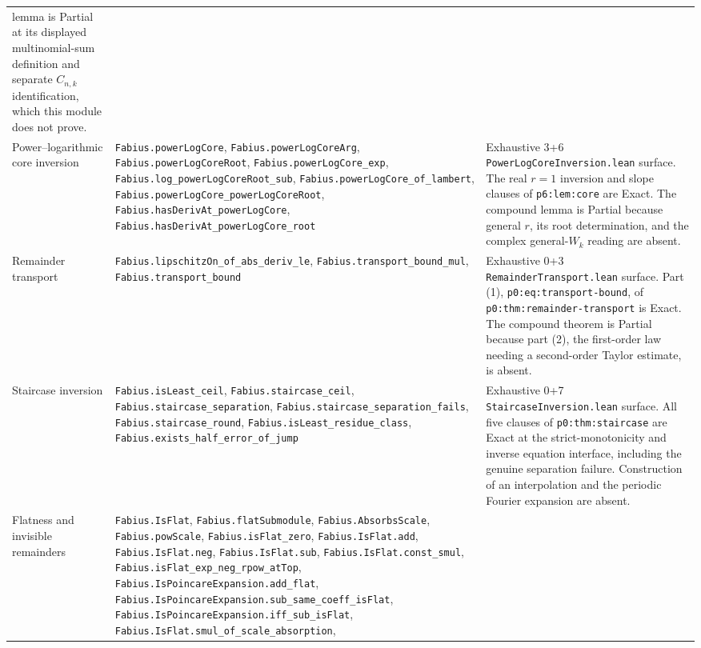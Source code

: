 \documentclass[11pt,oneside]{article}
\theoremstyle{definition}
\theoremstyle{remark}
\begin{document}
\begin{longtable}{@{}>{\raggedright\arraybackslash}p{} >{\raggedright\arraybackslash}p{} >{\raggedright\arraybackslash}p{}@{}}
lemma is Partial at its displayed multinomial-sum definition and separate
\(C_{n,k}\) identification, which this module does not prove. \\
Power--logarithmic core inversion &
\nolinkurl{Fabius.powerLogCore}, \nolinkurl{Fabius.powerLogCoreArg},
\nolinkurl{Fabius.powerLogCoreRoot},
\nolinkurl{Fabius.powerLogCore_exp},
\nolinkurl{Fabius.log_powerLogCoreRoot_sub},
\nolinkurl{Fabius.powerLogCore_of_lambert},
\nolinkurl{Fabius.powerLogCore_powerLogCoreRoot},
\nolinkurl{Fabius.hasDerivAt_powerLogCore},
\nolinkurl{Fabius.hasDerivAt_powerLogCore_root} & Exhaustive 3+6
\nolinkurl{PowerLogCoreInversion.lean} surface.  The real \(r=1\) inversion
and slope clauses of \nolinkurl{p6:lem:core} are Exact.  The compound lemma
is Partial because general \(r\), its root determination, and the complex
general-\(W_k\) reading are absent. \\
Remainder transport &
\nolinkurl{Fabius.lipschitzOn_of_abs_deriv_le},
\nolinkurl{Fabius.transport_bound_mul},
\nolinkurl{Fabius.transport_bound} & Exhaustive 0+3
\nolinkurl{RemainderTransport.lean} surface.  Part (1),
\nolinkurl{p0:eq:transport-bound}, of
\nolinkurl{p0:thm:remainder-transport} is Exact.  The compound theorem is
Partial because part (2), the first-order law needing a second-order Taylor
estimate, is absent. \\
Staircase inversion &
\nolinkurl{Fabius.isLeast_ceil}, \nolinkurl{Fabius.staircase_ceil},
\nolinkurl{Fabius.staircase_separation},
\nolinkurl{Fabius.staircase_separation_fails},
\nolinkurl{Fabius.staircase_round},
\nolinkurl{Fabius.isLeast_residue_class},
\nolinkurl{Fabius.exists_half_error_of_jump} & Exhaustive 0+7
\nolinkurl{StaircaseInversion.lean} surface.  All five clauses of
\nolinkurl{p0:thm:staircase} are Exact at the strict-monotonicity and inverse
equation interface, including the genuine separation failure.  Construction
of an interpolation and the periodic Fourier expansion are absent. \\
Flatness and invisible remainders &
\nolinkurl{Fabius.IsFlat}, \nolinkurl{Fabius.flatSubmodule},
\nolinkurl{Fabius.AbsorbsScale}, \nolinkurl{Fabius.powScale},
\nolinkurl{Fabius.isFlat_zero}, \nolinkurl{Fabius.IsFlat.add},
\nolinkurl{Fabius.IsFlat.neg}, \nolinkurl{Fabius.IsFlat.sub},
\nolinkurl{Fabius.IsFlat.const_smul},
\nolinkurl{Fabius.isFlat_exp_neg_rpow_atTop},
\nolinkurl{Fabius.IsPoincareExpansion.add_flat},
\nolinkurl{Fabius.IsPoincareExpansion.sub_same_coeff_isFlat},
\nolinkurl{Fabius.IsPoincareExpansion.iff_sub_isFlat},
\nolinkurl{Fabius.IsFlat.smul_of_scale_absorption},

\end{longtable}
\end{document}
